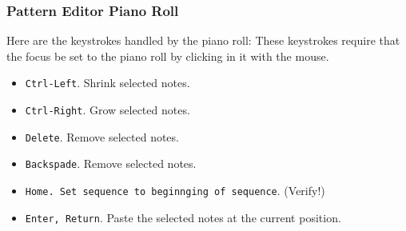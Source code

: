 
\subsubsection{Pattern Editor Piano Roll}
\label{subsubsec:kbd_mouse_pattern_editor_piano_roll}

   Here are the keystrokes handled by the piano roll:
   These keystrokes require that the focus be set to the piano roll by clicking
   in it with the mouse.

   \begin{itemize}
      \item \texttt{Ctrl-Left}.  Shrink selected notes.
      \item \texttt{Ctrl-Right}.  Grow selected notes.
      \item \texttt{Delete}.  Remove selected notes.
      \item \texttt{Backspade}.  Remove selected notes.
      \item \texttt{Home.  Set sequence to beginnging of sequence}.  (Verify!)
      \item \texttt{Enter, Return}.
         Paste the selected notes at the current position.
   \end{itemize}

